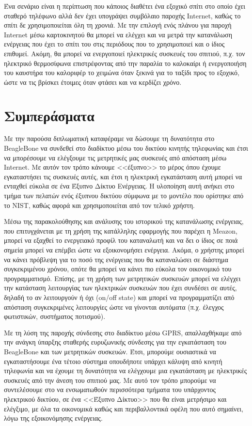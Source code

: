 \documentclass[12pt, a4paper, oneside]{report}
\begin{document}
Ένα σενάριο είναι η περίπτωση που κάποιος διαθέτει ένα εξοχικό σπίτι στο οποίο έχει σταθερό τηλέφωνο αλλά δεν έχει υπογράψει συμβόλαιο παροχής Internet, καθώς το σπίτι δε χρησιμοποιείται όλη τη χρονιά. Με την επιλογή ενός πλάνου για παροχή Internet μέσω καρτοκινητού θα μπορεί να ελέγχει και να μετρά την κατανάλωση ενέργειας που έχει το σπίτι του στις περιόδους που το χρησιμοποιεί και ο ίδιος επιθυμεί. Ακόμη, θα μπορεί να ενεργοποιεί ηλεκτρικές συσκευές του σπιτιού, π.χ. τον ηλεκτρικό θερμοσίφωνα επιστρέφοντας από την παραλία το καλοκαίρι ή ενεργοποιήση του καυστήρα του καλοριφέρ το χειμώνα όταν ξεκινά για το ταξίδι προς το εξοχικό, ώστε να τις βρίσκει έτοιμες όταν φτάσει και να κερδίζει χρόνο.


\section{Συμπεράσματα}

Με την παρούσα διπλωματική καταφέραμε να δώσουμε τη δυνατότητα στο BeagleBone να συνδεθεί στο διαδίκτυο μέσω του δικτύου κινητής τηλεφωνίας και έτσι να μπορέσουμε να ελέγξουμε τις μετρητικές μας συσκευές από απόσταση μέσω Internet. Με αυτόν τον τρόπο κάνουμε <<έξυπνο>> το μέρος όπου έχουμε εγκαταστήσει τις συσκευές αυτές, και έτσι η ηλεκτρική εγκατάσταση αυτή μπορεί να ενταχθεί εύκολα σε ένα Έξυπνο Δίκτυο Ενέργειας. Η υλοποίηση αυτή ανήκει στο τμήμα των πελατών ενός έξυπνου δικτύου σύμφωνα με το μοντέλο που ορίστηκε από το NIST\cite{21}, καθώς αφορά και χρησιμοποιείται από τον τελικό χρήστη.%

Μέσω της παρακολούθησης και ανάλυσης του ιστορικού της κατανάλωσης ενέργειας, που επιτυγχάνεται με τη χρήση της κατάλληλης εφαρμογής που παρέχει η Meazon, μπορεί να εξαχθεί το ενεργειακό προφίλ του καταναλωτή και να δει ο ίδιος σε ποιά σημεία μπορεί να επέμβει ώστε να εξοικονομήσει ενέργεια. Ακόμα, ο χρήστης μπορεί να κάνει πρόβλεψη για το ποσό της ενέργειας που θα καταναλώσει σε διάστημα συγκεκριμένου χρόνου, οπότε θα μπορεί να κάνει πιο εύκολα τον οικονομικό του προγραμματισμό. Επίσης, με τη χρήση των μετρητικών συσκευών μπορεί να ελέγχει την κατάσταση λειτουργίας των ηλεκτρικών συσκευών που έχει συνδέσει σε αυτές, δηλαδή το αν λειτουργούν ή όχι (on\slash of\mbox{}f state) και μπορεί να προγραμματίζει από απόσταση συγκεκριμένες λειτουργίες ώστε να γίνονται αυτόματα (π.χ. έλεγχος φωτιστικών, συστήματος ποτισμού).

Με τη λύση της παροχής σύνδεσης στο διαδίκτυο μέσω GPRS, απαλλαχθήκαμε από την ανάγκη ύπαρξης σταθερής ευρυζωνικής σύνδεσης για την εγκατάσταση του BeagleBone και των μετρητικών συσκευών. Έτσι, μπορούμε ουσιαστικά να εγκαταστήσουμε ένα τέτοιο σύστημα οπουδήποτε υπάρχει κάλυψη από κινητή τηλεφωνία και να έχουμε τη δυνατότητα να ελέγχουμε μια εγκατάσταση με ηλεκτρικές συσκευές από την άνεση του σπιτιού μας. Με αυτό τον τρόπο μπορούμε να συντελέσουμε στο να ενσωματωθούν περισσότερα τμήματα του υπάρχοντος ηλεκτρικού δικτύου, σε ένα <<Έξυπνο Δίκτυο>> που θα είναι μετρήσιμο και ελέγξιμο, με όλα τα οικονομικά καθώς και περιβαλλοντικά οφέλη που αυτό σημαίνει, λόγω της εξοικονόμησης ενέργειας.
\end{document}
